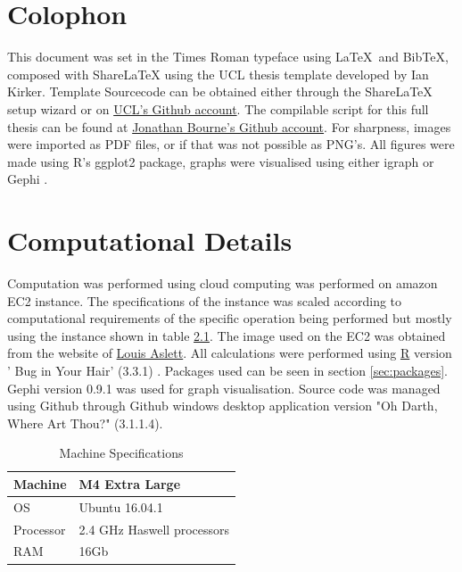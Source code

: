 \chapter{Colophon}
\label{appendixlabel3}
This document was set in the Times Roman typeface using \LaTeX\ and Bib\TeX , composed with ShareLaTeX using the UCL thesis template developed by Ian Kirker. Template Sourcecode can be obtained either through the ShareLaTeX setup wizard or on \href{https://github.com/UCL/ucl-latex-thesis-templates/blob/master/Main.tex}{UCL's Github account}.
The compilable script for this full thesis can be found at \href{https://github.com/JonnoB}{Jonathan Bourne's Github account}. For sharpness, images were imported as PDF files, or if that was not possible as PNG's. All figures were made using R's ggplot2 package, graphs were visualised using either igraph \cite{csrdi2006} or Gephi \cite{bastian2006}.


\chapter{Computational Details}
\label{TechComp}

Computation was performed using cloud computing was performed on amazon EC2 instance. 
The specifications of the instance was scaled according to computational requirements of the specific operation being performed but mostly using the instance shown in table \ref{tab:Machspec}. The image used on the EC2 was obtained from the website of \href{http://www.louisaslett.com/RStudio_AMI/}{Louis Aslett}. All calculations were performed using \href{https://www.r-project.org/}{R} version ' Bug in Your Hair' (3.3.1)  \cite{rcoreteam2016}. Packages used can be seen in section \ref{sec:packages}. Gephi version 0.9.1 was used for graph visualisation. Source code was managed using Github through Github windows desktop application version "Oh Darth, Where Art Thou?" (3.1.1.4).

\begin{table}[h]
\centering
\begin{tabular}{|l|l|}
\hline
Machine   & M4 Extra Large            \\ \hline
OS        & Ubuntu 16.04.1               \\ \hline
Processor & 2.4 GHz Haswell processors \\ \hline
RAM       & 16Gb                      \\ \hline
\end{tabular}
\caption{Machine Specifications}
\label{tab:Machspec}
\end{table}

